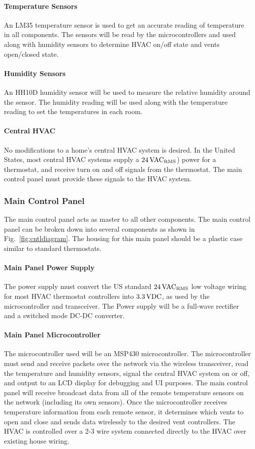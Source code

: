 \paragraph{Temperature Sensors}
An LM35 temperature sensor is used to get an accurate reading of temperature in all components. The sensors will be read by the microcontrollers and used along with humidity sensors to determine HVAC on/off state and vents open/closed state.
\paragraph{Humidity Sensors}
An HH10D humidity sensor will be used to measure the relative humidity around the sensor.  The humidity reading will be used along with the temperature reading to set the temperatures in each room.
\paragraph{Central HVAC}
No modifications to a home's central HVAC system is desired.  In the United States, most central HVAC systems supply a $24\, \rm VAC_{RMS}$) power for a thermostat, and receive turn on and off signals from the thermostat.  The main control panel must provide these signals to the HVAC system.
\subsubsection{Main Control Panel}
The main control panel acts as master to all other components.  The main control panel can be broken down into several components as shown in Fig.~\ref{fig:cntldiagram}. The housing for this main panel should be a plastic case similar to standard thermostats.
\paragraph{Main Panel Power Supply}
The power supply must convert the US standard $24\,\rm VAC_{RMS}$ low voltage wiring for most HVAC thermostat controllers into $3.3\,\rm VDC$, as used by the microcontroller and transceiver. The Power supply will be a full-wave rectifier and a switched mode DC-DC converter.
\paragraph{Main Panel Microcontroller}
The microcontroller used will be an MSP430 microcontroller. The microcontroller must send and receive packets over the network via the wireless transceiver, read the temperature and humidity sensors, signal the central HVAC system on or off, and output to an LCD display for debugging and UI purposes. The main control panel will receive broadcast data from all of the remote temperature sensors on the network (including its own sensors). Once the microcontroller receives temperature information from each remote sensor, it determines which vents to open and close and sends data wirelessly to the desired vent controllers. The HVAC is controlled over a 2-3 wire system connected directly to the HVAC over existing house wiring.
